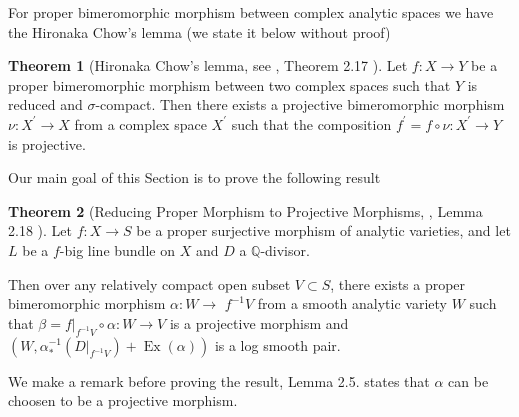 \documentclass[11pt]{article}
\theoremstyle{definition}
\newtheorem{theorem}{Theorem}[section]
\begin{document}
	For proper bimeromorphic morphism between complex analytic spaces we have the Hironaka Chow's lemma (we state it below without proof)
	\begin{theorem}[Hironaka Chow's lemma, see \cite{DasHacon}, Theorem 2.17 ]
		Let $f: X \rightarrow Y$ be a proper bimeromorphic morphism between two complex spaces such that $Y$ is reduced and $\sigma$-compact. Then there exists a projective bimeromorphic morphism $\nu: X^{\prime} \rightarrow X$ from a complex space $X^{\prime}$ such that the composition $f^{\prime}=f \circ \nu: X^{\prime} \rightarrow Y$ is projective.
	\end{theorem}
	
	Our main goal of this Section is to prove the following result
	\begin{theorem}[Reducing Proper Morphism to Projective Morphisms, \cite{DasHacon}, Lemma 2.18 ]
		Let $f: X \rightarrow S$ be a proper surjective morphism of analytic varieties, and let $L$ be a $f$-big line bundle on $X$ and $D$ a $\mathbb{Q}$-divisor. 
		
		Then over any relatively compact open subset $V \subset S$, there exists a proper bimeromorphic morphism $\alpha: W \rightarrow$ $f^{-1} V$ from a smooth analytic variety $W$ such that $\beta=\left.f\right|_{f^{-1} V} \circ \alpha: W \rightarrow V$ is a projective morphism and $\left(W, \alpha_*^{-1}\left(\left.D\right|_{f^{-1} V}\right)+\operatorname{Ex}(\alpha)\right)$ is a log smooth pair.
	\end{theorem}
	We make a remark before proving the result, \cite{ClaudonHoring} Lemma 2.5. states that $\alpha$ can be choosen to be a projective morphism.
\end{document}
